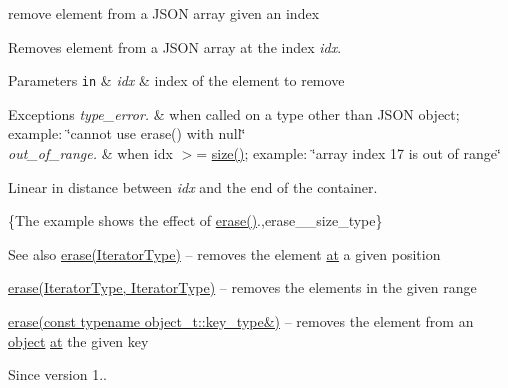 remove element from a J\+S\+ON array given an index 

Removes element from a J\+S\+ON array at the index {\itshape idx}.


\begin{DoxyParams}[1]{Parameters}
\mbox{\tt in}  & {\em idx} & index of the element to remove\\
\hline
\end{DoxyParams}

\begin{DoxyExceptions}{Exceptions}
{\em type\+\_\+error.} & when called on a type other than J\+S\+ON object; example\+: {\ttfamily \char`\"{}cannot use erase() with null\char`\"{}} \\
\hline
{\em out\+\_\+of\+\_\+range.} & when {\ttfamily idx $>$= \hyperlink{classnlohmann_1_1basic__json_a25e27ad0c6d53c01871c5485e1f75b96}{size()}}; example\+: {\ttfamily \char`\"{}array index 17
is out of range\char`\"{}}\\
\hline
\end{DoxyExceptions}
Linear in distance between {\itshape idx} and the end of the container.

\{The example shows the effect of {\ttfamily \hyperlink{classnlohmann_1_1basic__json_a068a16e76be178e83da6a192916923ed}{erase()}}.,erase\+\_\+\+\_\+size\+\_\+type\}

\begin{DoxySeeAlso}{See also}
\hyperlink{classnlohmann_1_1basic__json_a068a16e76be178e83da6a192916923ed}{erase(\+Iterator\+Type)} -- removes the element \hyperlink{classnlohmann_1_1basic__json_a73ae333487310e3302135189ce8ff5d8}{at} a given position 

\hyperlink{classnlohmann_1_1basic__json_a4b3f7eb2d4625d95a51fbbdceb7c5f39}{erase(\+Iterator\+Type, Iterator\+Type)} -- removes the elements in the given range 

\hyperlink{classnlohmann_1_1basic__json_a2f8484d69c55d8f2a9697a7bec29362a}{erase(const typename object\+\_\+t\+::key\+\_\+type\&)} -- removes the element from an \hyperlink{classnlohmann_1_1basic__json_a31f84ee15c4690ff705bed74736d04c6}{object} \hyperlink{classnlohmann_1_1basic__json_a73ae333487310e3302135189ce8ff5d8}{at} the given key
\end{DoxySeeAlso}
\begin{DoxySince}{Since}
version 1.. 
\end{DoxySince}
